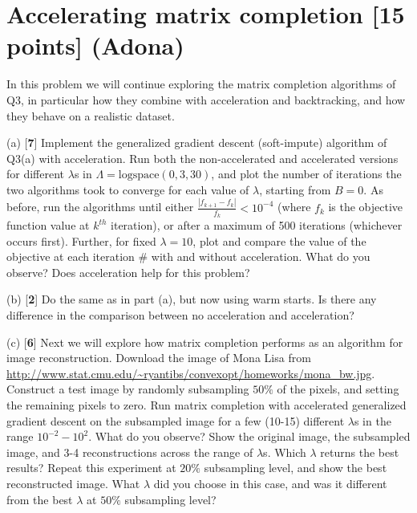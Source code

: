\section{ Accelerating matrix completion [15 points] (Adona)}

In this problem we will continue exploring the matrix completion algorithms of Q3, in particular how they combine with acceleration and backtracking, and how they behave on a realistic dataset. 

(a) [\textbf{7}] Implement the generalized gradient descent (soft-impute) algorithm of Q3(a) with acceleration. Run both the non-accelerated and accelerated versions for different $\lambda$s in $\Lambda = \text{logspace}(0,3,30)$, and plot the number of iterations the two algorithms took to converge for each value of $\lambda$, starting from $B=0$. As before, run the algorithms until either $\frac{|f_{k+1} - f_{k}|}{f_{k}} < 10^{-4}$ (where $f_k$ is the objective function value at $k^{th}$ iteration), or after a maximum of 500 iterations (whichever occurs first). Further, for fixed $\lambda = 10$, plot and compare the value of the objective at each iteration $\#$ with and without acceleration. What do you observe? Does acceleration help for this problem? 

(b) [\textbf{2}] Do the same as in part (a), but now using warm starts. Is there any difference in the comparison between no acceleration and acceleration?

(c) [\textbf{6}] Next we will explore how matrix completion performs as an algorithm for image reconstruction. Download the image of Mona Lisa from \url{http://www.stat.cmu.edu/~ryantibs/convexopt/homeworks/mona_bw.jpg}. Construct a test image by randomly subsampling $50\%$ of the pixels, and setting the remaining pixels to zero. Run matrix completion with accelerated generalized gradient descent on the subsampled image for a few (10-15) different $\lambda$s in the range $10^{-2} - 10^2$. What do you observe? Show the original image, the subsampled image, and 3-4 reconstructions across the range of $\lambda$s. Which $\lambda$ returns the best results? Repeat this experiment at $20\%$ subsampling level, and show the best reconstructed image. What $\lambda$ did you choose in this case, and was it different from the best $\lambda$ at $50\%$ subsampling level?


